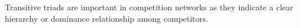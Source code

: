 \documentclass[preview]{standalone}
\begin{document}
Transitive triads are important in competition networks as they indicate a clear hierarchy or dominance relationship among competitors.\\
\end{document}
